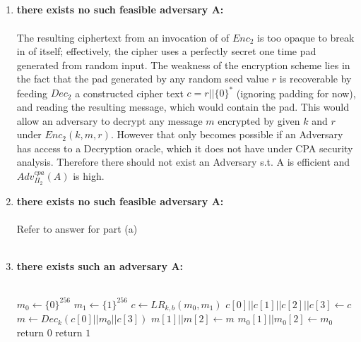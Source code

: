 \documentclass[]{article}
\begin{document}
\subsection{}
\begin{enumerate}[label=(\alph*)]
	\item \textbf{there exists no such feasible adversary A:}
	\\\\
	The resulting ciphertext from an invocation of of $Enc_2$ is too opaque to break in of itself; effectively, the cipher uses a perfectly secret one time pad generated from random input. The weakness of the encryption scheme lies in the fact that the pad generated by any random seed value $r$ is recoverable by feeding $Dec_2$ a constructed cipher text $c = r || \{0\}^*$ (ignoring padding for now), and reading the resulting message, which would contain the pad. This would allow an adversary to decrypt any message $m$ encrypted by given $k$ and $r$ under $Enc_2(k, m ,r)$. However that only becomes possible if an Adversary has access to a Decryption oracle, which it does not have under CPA security analysis. Therefore there should not exist an Adversary s.t. A is efficient and $Adv_{\Pi_2}^{cpa}(A)$ is high.
	\item \textbf{there exists no such feasible adversary A:}
	\\\\
	Refer to answer for part (a)
	\\\\
	\item
	\textbf{there exists such an adversary A:}
	\\\\
	\begin{algorithm}[H]
		\SetAlgoLined
		$m_0 \leftarrow \{0\}^{256}$\;
		$m_1 \leftarrow \{1\}^{256}$\;
		$c \leftarrow LR_{k,b}(m_0, m_1)$\;
		$c[0] || c[1] || c[2] || c[3] \leftarrow c$\;
		$m \leftarrow Dec_k(c[0]||m_0||c[3])$\;
		$m[1] || m[2] \leftarrow m$\;
		$m_0[1] || m_0[2] \leftarrow m_0$\;
		 {
			return $0$
		}
		return $1$
		\caption{$A(\Pi_2)$}
	\end{algorithm}
	

\end{enumerate}
\end{document}
